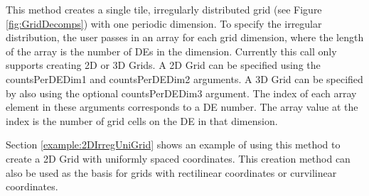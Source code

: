   
   This method creates a single tile, irregularly distributed grid
   (see Figure \ref{fig:GridDecomps}) with one periodic dimension.
   To specify the irregular distribution, the user passes in an array
   for each grid dimension, where the length of the array is the number
   of DEs in the dimension. Currently this call only
   supports creating 2D or 3D Grids. A 2D Grid can be specified using the
   countsPerDEDim1 and countsPerDEDim2 arguments.  A 3D Grid can
   be specified by also using the optional countsPerDEDim3 argument.
   The index of each array element in these arguments corresponds to
   a DE number.  The array value at the index is the number of grid
   cells on the DE in that dimension.
  
   Section \ref{example:2DIrregUniGrid} shows an example
   of using this method to create a 2D Grid with uniformly spaced
   coordinates.  This creation method can also be used as the basis for
   grids with rectilinear coordinates or curvilinear coordinates.
  
